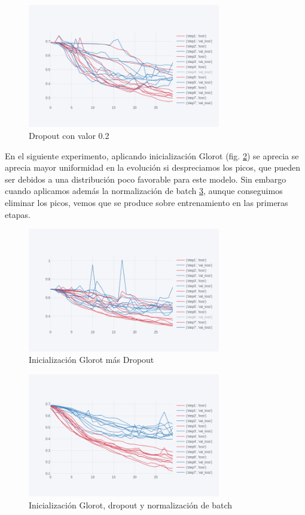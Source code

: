 \begin{figure}[H]
	\centering
	\includegraphics[width=0.75\textwidth]{imaxes/dropout0_2.png}
	\caption{Dropout con valor 0.2}
	\label{dropout02}
\end{figure}

En el siguiente experimento, aplicando inicialización Glorot (fig. \ref{glorot}) se aprecia se aprecia mayor uniformidad en la evolución si despreciamos los picos, que pueden ser debidos a una distribución poco favorable para este modelo. Sin embargo cuando aplicamos además la normalización de batch \ref{glorotbn}, aunque conseguimos eliminar los picos, vemos que se produce sobre entrenamiento en las primeras etapas.


\begin{figure}[H]
	\centering
	\includegraphics[width=0.75\textwidth]{imaxes/glorot.png}
	\caption{Inicialización Glorot más Dropout}
	\label{glorot}
\end{figure}

\begin{figure}[H]
	\centering
	\includegraphics[width=0.75\textwidth]{imaxes/glorot_bn.png}
	\caption{Inicialización Glorot, dropout y normalización de batch}
	\label{glorotbn}
\end{figure}

